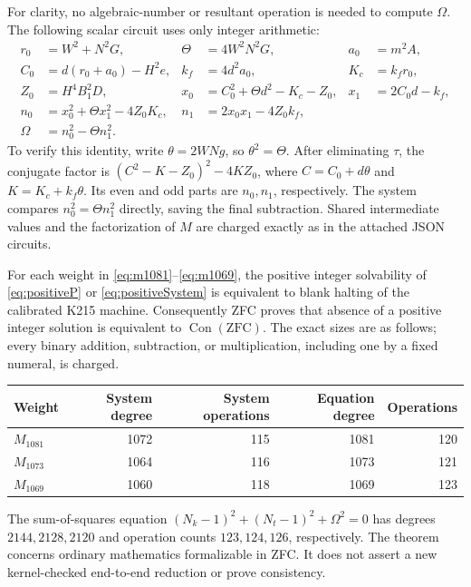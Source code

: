 For clarity, no algebraic-number or resultant operation is needed to
compute $\Omega$. The following scalar circuit uses only integer arithmetic:
\begin{align*}
 r_0&=W^2+N^2G,&\Theta&=4W^2N^2G,&a_0&=m^2A,\\
 C_0&=d(r_0+a_0)-H^2e,&k_f&=4d^2a_0,&K_c&=k_fr_0,\\
 Z_0&=H^4B_1^2D,&x_0&=C_0^2+\Theta d^2-K_c-Z_0,
   &x_1&=2C_0d-k_f,\\
 n_0&=x_0^2+\Theta x_1^2-4Z_0K_c,
   &n_1&=2x_0x_1-4Z_0k_f,\\
 \Omega&=n_0^2-\Theta n_1^2.
\end{align*}
To verify this identity, write $\theta=2WN g$, so $\theta^2=\Theta$.
After eliminating $\tau$, the conjugate factor is
$(C^2-K-Z_0)^2-4KZ_0$, where
$C=C_0+d\theta$ and $K=K_c+k_f\theta$.
Its even and odd parts are $n_0,n_1$, respectively.
The system compares $n_0^2=\Theta n_1^2$ directly, saving the final
subtraction. Shared intermediate values and the factorization of $M$ are
charged exactly as in the attached JSON circuits.

\begin{theorem}\label{thm:positive12}
For each weight in \eqref{eq:m1081}--\eqref{eq:m1069}, the positive
integer solvability of \eqref{eq:positiveP} or
\eqref{eq:positiveSystem} is equivalent to blank halting of the calibrated
K215 machine. Consequently ZFC proves that absence of a positive integer
solution is equivalent to $\operatorname{Con}(\mathrm{ZFC})$.
The exact sizes are as follows; every binary addition, subtraction, or
multiplication, including one by a fixed numeral, is charged.
\end{theorem}

\begin{center}
\begin{tabular}{lrrrr}
\hline
Weight & System degree & System operations & Equation degree & Operations\\
\hline
$M_{1081}$ &1072&115&1081&120\\
$M_{1073}$ &1064&116&1073&121\\
$M_{1069}$ &1060&118&1069&123\\
\hline
\end{tabular}
\end{center}

The sum-of-squares equation
$(N_k-1)^2+(N_t-1)^2+\Omega^2=0$ has degrees
$2144,2128,2120$ and operation counts $123,124,126$, respectively.
The theorem concerns ordinary mathematics formalizable in ZFC. It does
not assert a new kernel-checked end-to-end reduction or prove consistency.

